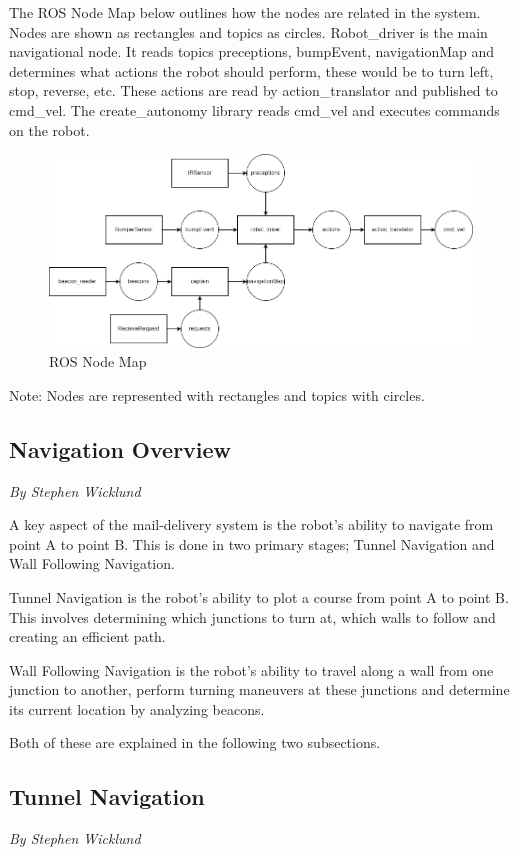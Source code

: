 \documentclass[12pt]{report}
\newcommand{\sectionAuthor}[1]{{\small\vspace{-1em}\textit{#1}}\bigskip\par}
\begin{document}
The ROS Node Map below outlines how the nodes are related in the system. Nodes are shown as rectangles and topics as circles. Robot\_driver is the main navigational node. It reads topics preceptions, bumpEvent, navigationMap and determines what actions the robot should perform, these would be to turn left, stop, reverse, etc. These actions are read by action\_translator and published to cmd\_vel. The create\_autonomy library reads cmd\_vel and executes commands on the robot.

\begin{figure}[H]
\caption{ROS Node Map}
\centering
\includegraphics[scale=0.5]{images/ROS Node Diagram Design.png}
\centering
\end{figure}
Note: Nodes are represented with rectangles and topics with circles.

\subsection{Navigation Overview}
\sectionAuthor{By Stephen Wicklund}
A key aspect of the mail-delivery system is the robot's ability to navigate from point A to point B. This is done in two primary stages; Tunnel Navigation and Wall Following Navigation.

Tunnel Navigation is the robot's ability to plot a course from point A to point B. This involves determining which junctions to turn at, which walls to follow and creating an efficient path.

Wall Following Navigation is the robot's ability to travel along a wall from one junction to another, perform turning maneuvers at these junctions and determine its current location by analyzing beacons.

Both of these are explained in the following two subsections.
\subsection{Tunnel Navigation}
\sectionAuthor{By Stephen Wicklund}
\end{document}
